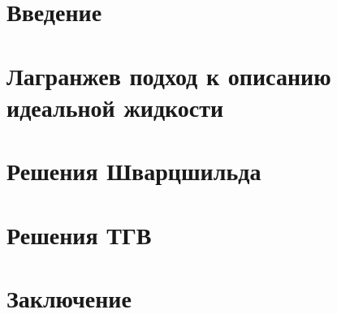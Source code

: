 \documentclass[12pt,a4paper,final]{article}
\def\docroot{../..}
\numberwithin{equation}{section}
\begin{document}
    \makedocroot

    
    \tableofcontents

    \newpage

    \section{Введение}
    

    \section{Лагранжев подход к описанию идеальной жидкости}
    

    \section{Решения Шварцшильда}
    

    \section{Решения ТГВ}
    

    \section{Заключение}
    

    \clearpage

    
    
\end{document}
